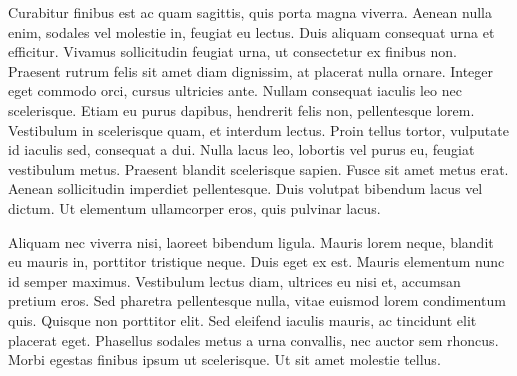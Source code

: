 Curabitur finibus est ac quam sagittis, quis porta magna viverra. Aenean nulla enim, sodales vel molestie in, feugiat eu lectus. Duis aliquam consequat urna et efficitur. Vivamus sollicitudin feugiat urna, ut consectetur ex finibus non. Praesent rutrum felis sit amet diam dignissim, at placerat nulla ornare. Integer eget commodo orci, cursus ultricies ante. Nullam consequat iaculis leo nec scelerisque. Etiam eu purus dapibus, hendrerit felis non, pellentesque lorem. Vestibulum in scelerisque quam, et interdum lectus. Proin tellus tortor, vulputate id iaculis sed, consequat a dui. Nulla lacus leo, lobortis vel purus eu, feugiat vestibulum metus. Praesent blandit scelerisque sapien. Fusce sit amet metus erat. Aenean sollicitudin imperdiet pellentesque. Duis volutpat bibendum lacus vel dictum. Ut elementum ullamcorper eros, quis pulvinar lacus.

Aliquam nec viverra nisi, laoreet bibendum ligula. Mauris lorem neque, blandit eu mauris in, porttitor tristique neque. Duis eget ex est. Mauris elementum nunc id semper maximus. Vestibulum lectus diam, ultrices eu nisi et, accumsan pretium eros. Sed pharetra pellentesque nulla, vitae euismod lorem condimentum quis. Quisque non porttitor elit. Sed eleifend iaculis mauris, ac tincidunt elit placerat eget. Phasellus sodales metus a urna convallis, nec auctor sem rhoncus. Morbi egestas finibus ipsum ut scelerisque. Ut sit amet molestie tellus.
